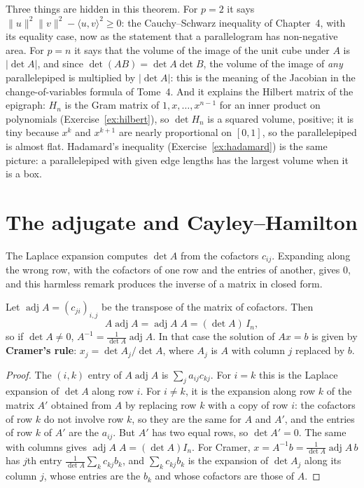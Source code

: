 Three things are hidden in this theorem. For $p=2$ it says $\|u\|^2\|v\|^2-\langle u,v\rangle^2\ge0$: the Cauchy--Schwarz inequality of Chapter~4, with its equality case, now as the statement that a parallelogram has non-negative area. For $p=n$ it says that the volume of the image of the unit cube under $A$ is $|\det A|$, and since $\det(AB)=\det A\det B$, the volume of the image of \emph{any} parallelepiped is multiplied by $|\det A|$: this is the meaning of the Jacobian in the change-of-variables formula of Tome~4. And it explains the Hilbert matrix of the epigraph: $H_n$ is the Gram matrix of $1,x,\dots,x^{n-1}$ for an inner product on polynomials (Exercise~\ref{ex:hilbert}), so $\det H_n$ is a squared volume, positive; it is tiny because $x^{k}$ and $x^{k+1}$ are nearly proportional on $[0,1]$, so the parallelepiped is almost flat. Hadamard's inequality (Exercise~\ref{ex:hadamard}) is the same picture: a parallelepiped with given edge lengths has the largest volume when it is a box.

\section{The adjugate and Cayley--Hamilton}

The Laplace expansion computes $\det A$ from the cofactors $c_{ij}$. Expanding along the wrong row, with the cofactors of one row and the entries of another, gives $0$, and this harmless remark produces the inverse of a matrix in closed form.

\begin{proposition}\label{prop:adjugate}
Let $\operatorname{adj}A=(c_{ji})_{i,j}$ be the transpose of the matrix of cofactors. Then
\[
A\operatorname{adj}A=\operatorname{adj}A\;A=(\det A)\,I_n ,
\]
so if $\det A\ne0$, $A^{-1}=\frac1{\det A}\operatorname{adj}A$. In that case the solution of $Ax=b$ is given by \textbf{Cramer's rule}: $x_j=\det A_j/\det A$, where $A_j$ is $A$ with column $j$ replaced by $b$.
\end{proposition}
\begin{proof}
The $(i,k)$ entry of $A\operatorname{adj}A$ is $\sum_ja_{ij}c_{kj}$. For $i=k$ this is the Laplace expansion of $\det A$ along row $i$. For $i\ne k$, it is the expansion along row $k$ of the matrix $A'$ obtained from $A$ by replacing row $k$ with a copy of row $i$: the cofactors of row $k$ do not involve row $k$, so they are the same for $A$ and $A'$, and the entries of row $k$ of $A'$ are the $a_{ij}$. But $A'$ has two equal rows, so $\det A'=0$. The same with columns gives $\operatorname{adj}A\;A=(\det A)I_n$. For Cramer, $x=A^{-1}b=\frac1{\det A}\operatorname{adj}A\,b$ has $j$th entry $\frac1{\det A}\sum_kc_{kj}b_k$, and $\sum_kc_{kj}b_k$ is the expansion of $\det A_j$ along its column $j$, whose entries are the $b_k$ and whose cofactors are those of $A$.
\end{proof}

